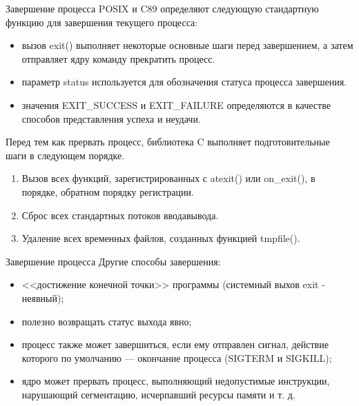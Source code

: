 \documentclass{beamer}
\begin{document}
\begin{frame}{Завершение процесса}
POSIX и C89 определяют следующую стандартную функцию для завершения текущего процесса:
\begin{itemize}
\item вызов exit() выполняет некоторые основные шаги перед завершением, а затем
отправляет ядру команду прекратить процесс.
\item параметр status используется для обозначения статуса процесса завершения.
\item значения EXIT\_SUCCESS и EXIT\_FAILURE определяются в качестве способов представления успеха и неудачи. 
\end{itemize}
Перед тем как прервать процесс, библиотека C выполняет подготовительные
шаги в следующем порядке.
\begin{enumerate}
\item Вызов всех функций, зарегистрированных с atexit() или on\_exit(), в порядке,
обратном порядку регистрации.
\item Сброс всех стандартных потоков ввода­вывода.
\item Удаление всех временных файлов, созданных функцией tmpfile().
\end{enumerate}
\end{frame}

\begin{frame}{Завершение процесса}
Другие способы завершения:
\begin{itemize}
\item <<достижение конечной точки>> программы (системный выхов exit - неявный);
\item полезно возвращать статус выхода явно;
\item процесс также может завершиться, если ему отправлен сигнал, действие которого по умолчанию — окончание процесса (SIGTERM и SIGKILL);
\item ядро может прервать процесс, выполняющий недопустимые инструкции, нарушающий сегментацию, исчерпавший ресурсы памяти и т. д.
\end{itemize}
\end{frame}
\end{document}
